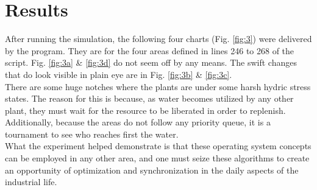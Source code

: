 \documentclass[12pt]{article}
\begin{document}
\section{Results}

After running the simulation, the following four charts (Fig. \ref{fig:3}) were delivered by the program. They are for the four areas defined in lines 246 to 268 of the script. Fig. \ref{fig:3a} \& \ref{fig:3d} do not seem off by any means. The swift changes that do look visible in plain eye are in Fig. \ref{fig:3b} \& \ref{fig:3c}. \\

There are some huge notches where the plants are under some harsh hydric stress states. The reason for this is because, as water becomes utilized by any other plant, they must wait for the resource to be liberated in order to replenish. Additionally, because the areas do not follow any priority queue, it is a tournament to see who reaches first the water. \\

What the experiment helped demonstrate is that these operating system concepts can be employed in any other area, and one must seize these algorithms to create an opportunity of optimization and synchronization in the daily aspects of the industrial life. \\
\end{document}
